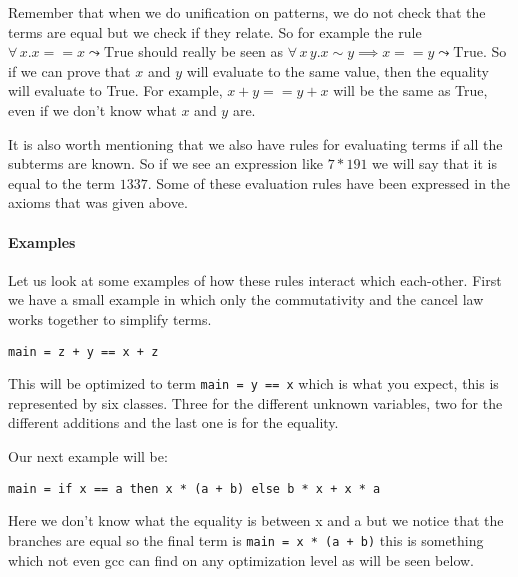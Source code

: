 Remember that when we do unification on patterns, we do not check that the terms
are equal but we check if they relate. So for example the rule $\forall \, x. x == x \leadsto \text{True}$
should really be seen as $\forall \, x \, y. x \sim y \implies x == y \leadsto \text{True}$.
So if we can prove that $x$ and $y$ will evaluate to the same value, then the equality
will evaluate to True. For example, $x + y == y + x$ will be the same as True, even
if we don't know what $x$ and $y$ are.

It is also worth mentioning that we also have rules for evaluating terms if all
the subterms are known. So if we see an expression like $7 * 191$ we will say that
it is equal to the term $1337$. Some of these evaluation rules have been expressed
in the axioms that was given above.

\paragraph{Examples}

Let us look at some examples of how these rules interact which each-other. First
we have a small example in which only the commutativity and the cancel law works
together to simplify terms.

\begin{verbatim}
main = z + y == x + z
\end{verbatim}

This will be optimized to term \verb|main = y == x| which is what you expect, this
is represented by six classes. Three for the different unknown variables, two
for the different additions and the last one is for the equality. 

Our next example will be:

\begin{verbatim}
main = if x == a then x * (a + b) else b * x + x * a
\end{verbatim}

Here we don't know what the equality is between x and a but we notice that the branches
are equal so the final term is \verb"main = x * (a + b)" this is something which
not even gcc can find on any optimization level as will be seen below.

